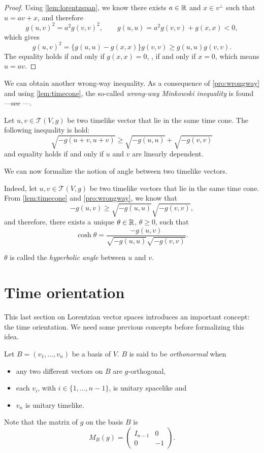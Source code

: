 \begin{proof}
    Using \autoref{lem:lorentzspan}, we know there exists $a \in \mathbb{R}$ and $x \in v^\perp$ such that $u=av+x$, and therefore
    \[
        g(u,v)^2=a^2g(v,v)^2, \quad \quad g(u,u)=a^2g(v,v)+g(x,x)<0,
    \]
    which gives
    \[
        g(u,v)^2=\{g(u,u)-g(x,x)\}g(v,v) \geq g(u,u)g(v,v).
    \]
    The equality holds if and only if $g(x,x)=0$, \ie, if and only if $x=0$, which means $u=av$.
\end{proof}


We can obtain another wrong-way inequality. As a consequence of \autoref{pro:wrongway} and using \autoref{lem:timecone}, the so-called \emph{wrong-way Minkowski inequality} is found ---see \cite[Cor. 5.31]{oneill83}---.

\begin{corollary}
	\label{Minkowski}
    Let $u,v \in \mathcal{T}(V,g)$ be two timelike vector that lie in the same time cone. The following inequality is hold:
    \[
        \sqrt{-g(u+v,u+v)} \geq \sqrt{-g(u,u)}+\sqrt{-g(v,v)}
    \]
    and equality holds if and only if $u$ and $v$ are linearly dependent.
\end{corollary}

We can now formalize the notion of angle between two timelike vectors.

Indeed, let $u, v \in \mathcal{T}(V,g)$ be two timelike vectors that lie in the same time cone. From \autoref{lem:timecone} and \autoref{pro:wrongway}, we know that
\[
-g(u,v) \geq \sqrt{-g(u,u)}\sqrt{-g(v,v)},
\]
and therefore, there exists a unique $\theta \in \mathbb{R}$, $\theta \geq 0$, such that
\[
\cosh \theta =\frac{-g(u,v)}{\sqrt{-g(u,u)}\sqrt{-g(v,v)}}.
\]

$\theta$ is called the \emph{hyperbolic angle} between $u$ and $v$.

\section{Time orientation}

This last section on Lorentzian vector spaces introduces an important concept: the time orientation. We need some previous concepts before formalizing this idea.

\begin{definition}
	Let $B = (v_1, \dots, v_n)$ be a basis of $V$. $B$ is said to be \emph{orthonormal} when
	\begin{itemize}
		\item any two different vectors on $B$ are $g$-orthogonal,
		\item each $v_i$, with $i \in \{1,\dots,n-1\}$, is unitary spacelike and
		\item $v_n$ is unitary timelike.
	\end{itemize}

	Note that the matrix of $g$ on the basis $B$ is
	\[
		M_B(g) = \begin{pmatrix}
			I_{n-1} & 0  \\
			0 & -1
		\end{pmatrix}.
	\]
\end{definition}

